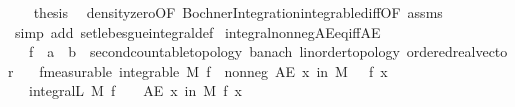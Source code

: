 \begin{isabellebody}
\isanewline
\ \ \isamarkupfalse%
\ {\isacharquery}{\kern0pt}thesis\ \isamarkupfalse%
\ density{\isacharunderscore}{\kern0pt}zero{\isacharbrackleft}{\kern0pt}OF\ Bochner{\isacharunderscore}{\kern0pt}Integration{\isachardot}{\kern0pt}integrable{\isacharunderscore}{\kern0pt}diff{\isacharbrackleft}{\kern0pt}OF\ assms{\isacharparenleft}{\kern0pt}{}{\isacharcomma}{\kern0pt}{}{\isacharparenright}{\kern0pt}{\isacharbrackright}{\kern0pt}{\isacharbrackright}{\kern0pt}\ \isamarkupfalse%
\ {\isacharparenleft}{\kern0pt}simp\ add{\isacharcolon}{\kern0pt}\ set{\isacharunderscore}{\kern0pt}lebesgue{\isacharunderscore}{\kern0pt}integral{\isacharunderscore}{\kern0pt}def{\isacharparenright}{\kern0pt}\isanewline
{}\isamarkupfalse%
%
\endisatagproof
{\isafoldproof}%
%
\isadelimproof
\isanewline
%
\endisadelimproof
\isanewline
{}\isamarkupfalse%
\ integral{\isacharunderscore}{\kern0pt}nonneg{\isacharunderscore}{\kern0pt}AE{\isacharunderscore}{\kern0pt}eq{\isacharunderscore}{\kern0pt}{}{\isacharunderscore}{\kern0pt}iff{\isacharunderscore}{\kern0pt}AE{\isacharcolon}{\kern0pt}\isanewline
\ \ \ f\ {\isacharcolon}{\kern0pt}{\isacharcolon}{\kern0pt}\ {\isachardoublequoteopen}{\isacharprime}{\kern0pt}a\ {\isasymRightarrow}\ {\isacharprime}{\kern0pt}b\ {\isacharcolon}{\kern0pt}{\isacharcolon}{\kern0pt}\ {\isacharbraceleft}{\kern0pt}second{\isacharunderscore}{\kern0pt}countable{\isacharunderscore}{\kern0pt}topology{\isacharcomma}{\kern0pt}\ banach{\isacharcomma}{\kern0pt}\ linorder{\isacharunderscore}{\kern0pt}topology{\isacharcomma}{\kern0pt}\ ordered{\isacharunderscore}{\kern0pt}real{\isacharunderscore}{\kern0pt}vector{\isacharbraceright}{\kern0pt}{\isachardoublequoteclose}\isanewline
\ \ \ f{\isacharbrackleft}{\kern0pt}measurable{\isacharbrackright}{\kern0pt}{\isacharcolon}{\kern0pt}\ {\isachardoublequoteopen}integrable\ M\ f{\isachardoublequoteclose}\ \ nonneg{\isacharcolon}{\kern0pt}\ {\isachardoublequoteopen}AE\ x\ in\ M{\isachardot}{\kern0pt}\ {}\ {\isasymle}\ f\ x{\isachardoublequoteclose}\isanewline
\ \ \ {\isachardoublequoteopen}integral\isactrlsup L\ M\ f\ {\isacharequal}{\kern0pt}\ {}\ {\isasymlongleftrightarrow}\ {\isacharparenleft}{\kern0pt}AE\ x\ in\ M{\isachardot}{\kern0pt}\ f\ x\ {\isacharequal}{\kern0pt}\ {}{\isacharparenright}{\kern0pt}{\isachardoublequoteclose}\isanewline
%
\isadelimproof
%
\endisadelimproof
%
\isatagproof
{}\isamarkupfalse%

\end{isabellebody}
